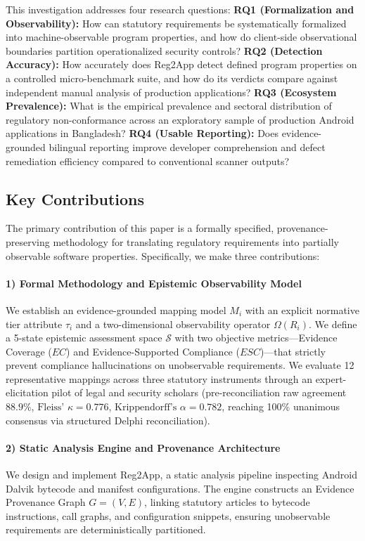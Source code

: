 This investigation addresses four research questions:
\textbf{RQ1 (Formalization and Observability):} How can statutory requirements be systematically formalized into machine-observable program properties, and how do client-side observational boundaries partition operationalized security controls?
\textbf{RQ2 (Detection Accuracy):} How accurately does Reg2App detect defined program properties on a controlled micro-benchmark suite, and how do its verdicts compare against independent manual analysis of production applications?
\textbf{RQ3 (Ecosystem Prevalence):} What is the empirical prevalence and sectoral distribution of regulatory non-conformance across an exploratory sample of production Android applications in Bangladesh?
\textbf{RQ4 (Usable Reporting):} Does evidence-grounded bilingual reporting improve developer comprehension and defect remediation efficiency compared to conventional scanner outputs?

\subsection{Key Contributions}
\label{sec:intro:contributions}

The primary contribution of this paper is a formally specified, provenance-preserving methodology for translating regulatory requirements into partially observable software properties. Specifically, we make three contributions:

\paragraph{1) Formal Methodology and Epistemic Observability Model} We establish an evidence-grounded mapping model $M_i$ with an explicit normative tier attribute $\tau_i$ and a two-dimensional observability operator $\Omega(R_i)$. We define a 5-state epistemic assessment space $\mathcal{S}$ with two objective metrics—Evidence Coverage ($EC$) and Evidence-Supported Compliance ($ESC$)—that strictly prevent compliance hallucinations on unobservable requirements. We evaluate 12 representative mappings across three statutory instruments through an expert-elicitation pilot of legal and security scholars (pre-reconciliation raw agreement $88.9\%$, $\text{Fleiss' } \kappa = 0.776$, $\text{Krippendorff's } \alpha = 0.782$, reaching 100\% unanimous consensus via structured Delphi reconciliation).

\paragraph{2) Static Analysis Engine and Provenance Architecture} We design and implement Reg2App, a static analysis pipeline inspecting Android Dalvik bytecode and manifest configurations. The engine constructs an Evidence Provenance Graph $G = (V, E)$, linking statutory articles to bytecode instructions, call graphs, and configuration snippets, ensuring unobservable requirements are deterministically partitioned.

